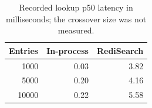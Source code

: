 \begin{table}[H]
\centering
\footnotesize
\caption{Recorded lookup p50 latency in milliseconds; the crossover size was not measured.}
\label{tab:backend}
\begin{tabular}{|r|r|r|}
\hline
Entries & In-process & RediSearch \\ \hline
1000 & 0.03 & 3.82 \\ \hline
5000 & 0.20 & 4.16 \\ \hline
10000 & 0.22 & 5.58 \\ \hline
\end{tabular}
\end{table}
